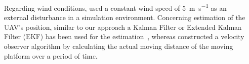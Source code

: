 \documentclass[conference]{IEEEtran}
\begin{document}
Regarding wind conditions, \cite{feng2018autonomous} used
a constant wind speed of \SI{5}{\m \per \s} as an external disturbance in a
simulation environment. 
%
%
Concerning estimation of the UAV's position,
similar to our approach a Kalman Filter or Extended Kalman Filter (EKF) has been used for the
estimation~\cite{saripalli2003landing,araar2017vision,feng2018autonomous,
  falanga2017vision}, whereas \cite{yang2018hybrid}
constructed a velocity observer algorithm by calculating the actual
moving distance of the moving platform over a period of time.


 
\end{document}
